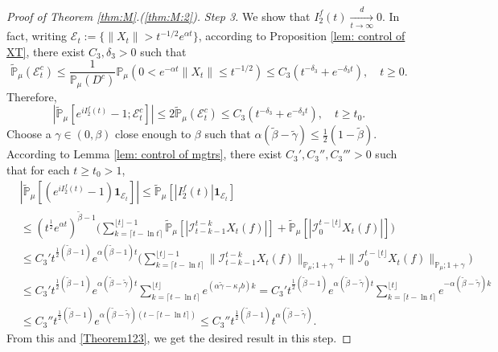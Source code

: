 \documentclass[12pt,a4paper]{amsart}
\theoremstyle{plain}
\theoremstyle{definition}
\numberwithin{equation}{section}
\begin{document}
\begin{proof}[Proof of Theorem \ref{thm:M}.(\ref{thm:M:2})]
  \emph{Step 3.}
  We show that $ I^f_2(t)\xrightarrow[t\to \infty]{d} 0$.
  In fact, writing $\mathcal{E}_t:=\{\|X_t\|>t^{-1/2}e^{\alpha t}\}$, according to Proposition \ref{lem: control of XT}, there exist $C_3, \delta_3>0$ such that
  \begin{equation}
    \mathbb{\widetilde{P}}_{\mu}(\mathcal{E}^c_t)
    \leq \frac{1}{\mathbb{P}_{\mu}(D^c)}\mathbb{P}_{\mu}(0<e^{-\alpha t}\|X_t\|\leq t^{-1/2})\leq C_3( t^{-\delta_3}+e^{-\delta_3 t})
    , \quad t\geq0.
  \end{equation}
  Therefore,
  \begin{equation}
    \label{Theorem123}
    |\mathbb{\widetilde{P}}_{\mu}[e^{i I^f_2(t)}-1;\mathcal{E}^c_t]|
    \leq 2\mathbb{\widetilde{P}}_{\mu}(\mathcal{E}^c_t)
    \leq C_3(t^{-\delta_3}+e^{-\delta_3 t}),
    \quad t\geq t_0.
  \end{equation}
  Choose a $\gamma\in (0,\beta)$ close enough to $\beta$ such that $\alpha(\tilde \beta - \tilde \gamma) \leq \frac{1}{2}(1- \tilde \beta)$.
	According to Lemma \ref{lem: control of mgtrs}, there exist $C_3',C_3'',C_3'''>0$ such that for each $t\geq t_0 >1$,
  \begin{align}
    & |\mathbb{\widetilde{P}}_{\mu} [ (e^{i I^f_2(t)}-1)\mathbf{1}_{\mathcal{E}_t}]|
      \leq  \mathbb{\widetilde{P}}_{\mu} [ |I^f_2(t)|\mathbf{1}_{\mathcal{E}_t}] \\
    & \leq  (t^{\frac{1}{2}} e^{\alpha t} )^{\tilde \beta - 1}\Big(\sum_{k=\lceil t-\ln t \rceil}^{\lfloor t \rfloor - 1}\mathbb{\widetilde{P}}_{\mu} [| \mathcal{I}_{t-k-1}^{t-k} X_t(f) |] + \mathbb{\widetilde{P}}_{\mu}[| \mathcal{I}_{0}^{t-\lfloor t\rfloor} X_t(f)|]\Big) \\
    & \leq C_3' t^{\frac{1}{2}(\tilde \beta - 1)} e^{\alpha(\tilde \beta - 1)t}\Big(\sum_{k=\lceil t-\ln t \rceil}^{\lfloor t \rfloor - 1}\|\mathcal{I}_{t-k-1}^{t-k} X_t(f) \|_{\mathbb P_\mu; 1+\gamma} + \|\mathcal I_0^{t-\lfloor t \rfloor} X_t(f)\|_{\mathbb P_\mu;1+\gamma}\Big) \\
    & \leq C_3' t^{\frac{1}{2}(\tilde \beta - 1)} e^{\alpha (\tilde \beta - \tilde \gamma)t}\sum_{k=\lceil t-\ln t \rceil}^{\lfloor t \rfloor}  e^{(\alpha\tilde \gamma-\kappa_f b)k}
      = C_3' t^{\frac{1}{2}(\tilde \beta - 1)} e^{\alpha(\tilde \beta - \tilde \gamma) t}\sum_{k=\lceil t-\ln t \rceil}^{\lfloor t \rfloor}  e^{-\alpha (\tilde \beta -\tilde \gamma) k}
\\
    & \leq C_3'' t^{\frac{1}{2}(\tilde \beta - 1)} e^{\alpha (\tilde \beta - \tilde \gamma)(t - \lceil t - \ln t\rceil)}
      \leq C_3'' t^{\frac{1}{2}(\tilde \beta - 1)} t^{\alpha (\tilde \beta - \tilde \gamma)}.
  \end{align}
From this and \eqref{Theorem123}, we get the desired result in this step.


\end{proof}
\end{document}
